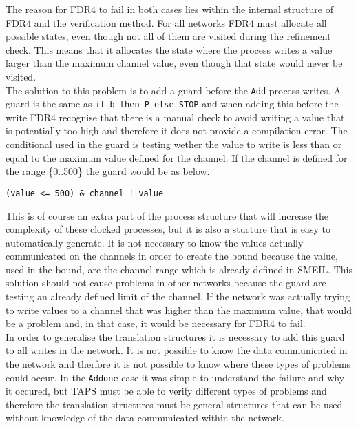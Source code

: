 The reason for FDR4 to fail in both cases lies within the internal structure of FDR4 and the verification method. For all networks FDR4 must allocate all possible states, even though not all of them are visited during the refinement check. This means that it allocates the state where the process writes a value larger than the maximum channel value, even though that state would never be visited.\\

The solution to this problem is to add a guard before the \texttt{Add} process writes. A \cspm{} guard is the same as \texttt{if b then P else STOP} and when adding this before the write FDR4 recognise that there is a manual check to avoid writing a value that is potentially too high and therefore it does not provide a compilation error. The conditional used in the guard is testing wether the value to write is less than or equal to the maximum value defined for the channel. If the channel is defined for the range \{0..500\} the guard would be as below.
\begin{verbatim}
(value <= 500) & channel ! value
\end{verbatim}

This is of course an extra part of the process structure that will increase the complexity of these clocked processes, but it is also a stucture that is easy to automatically generate. It is not necessary to know the values actually communicated on the channels in order to create the bound because the value, used in the bound, are the channel range which is already defined in SMEIL. This solution should not cause problems in other networks because the guard are testing an already defined limit of the channel. If the network was actually trying to write values to a channel that was higher than the maximum value, that would be a problem and, in that case, it would be necessary for FDR4 to fail. \\

In order to generalise the translation structures it is necessary to add this guard to all writes in the network. It is not possible to know the data communicated in the network and therfore it is not possible to know where these types of problems could occur. In the \texttt{Addone} case it was simple to understand the failure and why it occured, but TAPS must be able to verify different types of problems and therefore the translation structures must be general structures that can be used without knowledge of the data communicated within the network. \\

